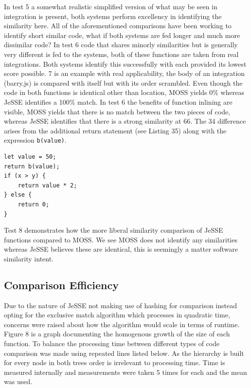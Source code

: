 \documentclass[jou,apacite]{apa6}
\begin{document}
In test 5 a somewhat realistic simplified version of what may be seen in integration is present, both systems perform excellency in identifying the similarity here. All of the aforementioned comparisons have been working to identify short similar code, what if both systems are fed longer and much more dissimilar code? In test 6  code that shares minorly similarities but is generally very different is fed to the systems, both of these functions are taken from real integrations. Both systems identify this successfully with each provided its lowest score possible. 7 is an example with real applicability, the body of an integration (barry.js) is compared with itself but with its order scrambled. Even though the code in both functions is identical other than location, MOSS yields 0\% whereas JeSSE identifies a 100\% match. In test 6 the benefits of function inlining are visible, MOSS yields that there is no match between the two pieces of code, whereas JeSSE identifies that there is a strong similarity at 66. The 34 difference arises from the additional return statement (see Listing 35) along with the expression \texttt{b(value)}.

\begin{lstlisting}[caption= Test 6 with function inlined]
	let value = 50;
return b(value);
if (x > y) {
    return value * 2;
} else {
    return 0;
}

\end{lstlisting}

Test 8 demonstrates how the more liberal similarity comparison of JeSSE functions compared to MOSS. We see MOSS does not identify any similarities whereas JeSSE believes these are identical, this is seemingly a matter software similarity intent. 

\subsection{Comparison Efficiency}

Due to the nature of JeSSE not making use of hashing for comparison instead opting for the exclusive match algorithm which processes in quadratic time, concerns were raised about how the algorithm would scale in terms of runtime. Figure 8 is a graph documenting the homogenous growth of the size of each function. To balance the processing time between different types of code comparison was made using repeated lines listed below. As the hierarchy is built for every node in both trees order is irrelevant to processing time. Time is measured internally and measurements were taken 5 times for each and the mean was used.
\end{document}
